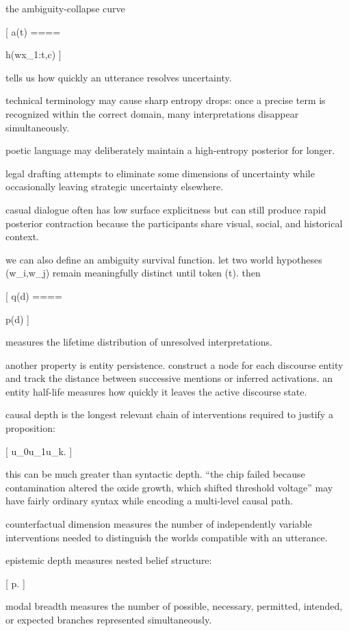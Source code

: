 the ambiguity-collapse curve

[
a(t)
====

h(w\mid x_{1:t},c)
]

tells us how quickly an utterance resolves uncertainty.

technical terminology may cause sharp entropy drops: once a precise term is recognized within the correct domain, many interpretations disappear simultaneously.

poetic language may deliberately maintain a high-entropy posterior for longer.

legal drafting attempts to eliminate some dimensions of uncertainty while occasionally leaving strategic uncertainty elsewhere.

casual dialogue often has low surface explicitness but can still produce rapid posterior contraction because the participants share visual, social, and historical context.

we can also define an ambiguity survival function. let two world hypotheses (w_i,w_j) remain meaningfully distinct until token (t). then

[
q(d)
====

p(d)
]

measures the lifetime distribution of unresolved interpretations.

another property is entity persistence. construct a node for each discourse entity and track the distance between successive mentions or inferred activations. an entity half-life measures how quickly it leaves the active discourse state.

causal depth is the longest relevant chain of interventions required to justify a proposition:

[
u_0\rightarrow u_1\rightarrow\cdots\rightarrow u_k.
]

this can be much greater than syntactic depth. “the chip failed because contamination altered the oxide growth, which shifted threshold voltage” may have fairly ordinary syntax while encoding a multi-level causal path.

counterfactual dimension measures the number of independently variable interventions needed to distinguish the worlds compatible with an utterance.

epistemic depth measures nested belief structure:

[
p.
]

modal breadth measures the number of possible, necessary, permitted, intended, or expected branches represented simultaneously.

